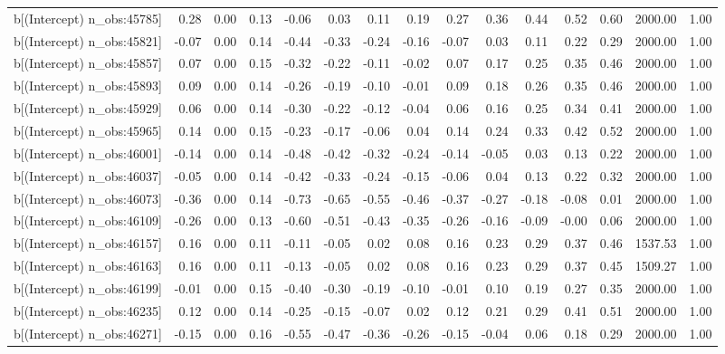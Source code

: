 \begin{table}[ht]
\begin{tabular}{rrrrrrrrrrrrrrr}
  b[(Intercept) n\_obs:45785] & 0.28 & 0.00 & 0.13 & -0.06 & 0.03 & 0.11 & 0.19 & 0.27 & 0.36 & 0.44 & 0.52 & 0.60 & 2000.00 & 1.00 \\ 
  b[(Intercept) n\_obs:45821] & -0.07 & 0.00 & 0.14 & -0.44 & -0.33 & -0.24 & -0.16 & -0.07 & 0.03 & 0.11 & 0.22 & 0.29 & 2000.00 & 1.00 \\ 
  b[(Intercept) n\_obs:45857] & 0.07 & 0.00 & 0.15 & -0.32 & -0.22 & -0.11 & -0.02 & 0.07 & 0.17 & 0.25 & 0.35 & 0.46 & 2000.00 & 1.00 \\ 
  b[(Intercept) n\_obs:45893] & 0.09 & 0.00 & 0.14 & -0.26 & -0.19 & -0.10 & -0.01 & 0.09 & 0.18 & 0.26 & 0.35 & 0.46 & 2000.00 & 1.00 \\ 
  b[(Intercept) n\_obs:45929] & 0.06 & 0.00 & 0.14 & -0.30 & -0.22 & -0.12 & -0.04 & 0.06 & 0.16 & 0.25 & 0.34 & 0.41 & 2000.00 & 1.00 \\ 
  b[(Intercept) n\_obs:45965] & 0.14 & 0.00 & 0.15 & -0.23 & -0.17 & -0.06 & 0.04 & 0.14 & 0.24 & 0.33 & 0.42 & 0.52 & 2000.00 & 1.00 \\ 
  b[(Intercept) n\_obs:46001] & -0.14 & 0.00 & 0.14 & -0.48 & -0.42 & -0.32 & -0.24 & -0.14 & -0.05 & 0.03 & 0.13 & 0.22 & 2000.00 & 1.00 \\ 
  b[(Intercept) n\_obs:46037] & -0.05 & 0.00 & 0.14 & -0.42 & -0.33 & -0.24 & -0.15 & -0.06 & 0.04 & 0.13 & 0.22 & 0.32 & 2000.00 & 1.00 \\ 
  b[(Intercept) n\_obs:46073] & -0.36 & 0.00 & 0.14 & -0.73 & -0.65 & -0.55 & -0.46 & -0.37 & -0.27 & -0.18 & -0.08 & 0.01 & 2000.00 & 1.00 \\ 
  b[(Intercept) n\_obs:46109] & -0.26 & 0.00 & 0.13 & -0.60 & -0.51 & -0.43 & -0.35 & -0.26 & -0.16 & -0.09 & -0.00 & 0.06 & 2000.00 & 1.00 \\ 
  b[(Intercept) n\_obs:46157] & 0.16 & 0.00 & 0.11 & -0.11 & -0.05 & 0.02 & 0.08 & 0.16 & 0.23 & 0.29 & 0.37 & 0.46 & 1537.53 & 1.00 \\ 
  b[(Intercept) n\_obs:46163] & 0.16 & 0.00 & 0.11 & -0.13 & -0.05 & 0.02 & 0.08 & 0.16 & 0.23 & 0.29 & 0.37 & 0.45 & 1509.27 & 1.00 \\ 
  b[(Intercept) n\_obs:46199] & -0.01 & 0.00 & 0.15 & -0.40 & -0.30 & -0.19 & -0.10 & -0.01 & 0.10 & 0.19 & 0.27 & 0.35 & 2000.00 & 1.00 \\ 
  b[(Intercept) n\_obs:46235] & 0.12 & 0.00 & 0.14 & -0.25 & -0.15 & -0.07 & 0.02 & 0.12 & 0.21 & 0.29 & 0.41 & 0.51 & 2000.00 & 1.00 \\ 
  b[(Intercept) n\_obs:46271] & -0.15 & 0.00 & 0.16 & -0.55 & -0.47 & -0.36 & -0.26 & -0.15 & -0.04 & 0.06 & 0.18 & 0.29 & 2000.00 & 1.00 \\ 

\end{tabular}
\end{table}
